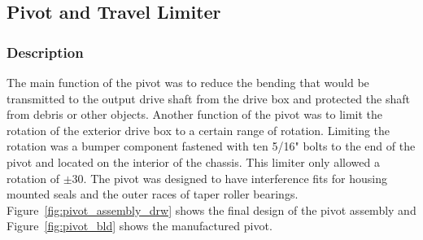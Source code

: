 \subsection{Pivot and Travel Limiter}
\subsubsection{Description}
The main function of the pivot was to reduce the bending that would be transmitted to the output drive shaft from the drive box and protected the shaft from debris or other objects. Another function of the pivot was to limit the rotation of the exterior drive box to a certain range of rotation. Limiting the rotation was a bumper component fastened with ten 5/16" bolts to the end of the pivot and located on the interior of the chassis. This limiter only allowed a rotation of $\pm$30\degree. The pivot was designed to have interference fits for housing mounted seals and the outer races of taper roller bearings. Figure~\ref{fig:pivot_assembly_drw} shows the final design of the pivot assembly and Figure~\ref{fig:pivot_bld} shows the manufactured pivot.

